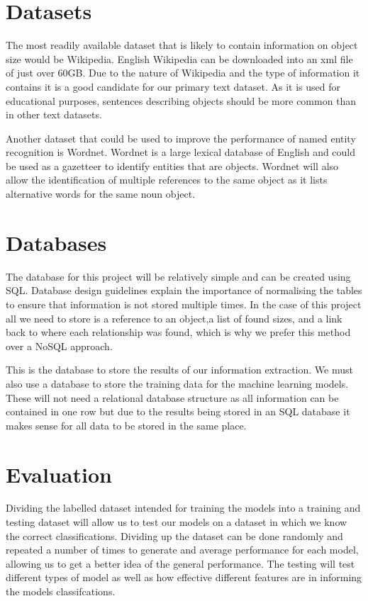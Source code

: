 \documentclass[11pt,oneside]{book}
\begin{document}
\section{Datasets}
The most readily available dataset that is likely to contain information on object size would be Wikipedia. English Wikipedia can be downloaded into an xml file of just over 60GB. Due to the nature of Wikipedia and the type of information it contains it is a good candidate for our primary text dataset. As it is used for educational purposes, sentences describing objects should be more common than in other text datasets.

Another dataset that could be used to improve the performance of named entity recognition is Wordnet. Wordnet is a large lexical database of English and could be used as a gazetteer to identify entities that are objects. Wordnet will also allow the identification of multiple references to the same object as it lists alternative words for the same noun object.

\section{Databases}
The database for this project will be relatively simple and can be created using SQL. Database design guidelines explain the importance of normalising the tables to ensure that information is not stored multiple times. In the case of this project all we need to store is a reference to an object,a list of found sizes, and a link back to where each relationship was found, which is why we prefer this method over a NoSQL approach.

This is the database to store the results of our information extraction. We must also use a database to store the training data for the machine learning models. These will not need a relational database structure as all information can be contained in one row but due to the results being stored in an SQL database it makes sense for all data to be stored in the same place.

\section{Evaluation}
Dividing the labelled dataset intended for training the models into a training and testing dataset will allow us to test our models on a dataset in which we know the correct classifications. Dividing up the dataset can be done randomly and repeated a number of times to generate and average performance for each model, allowing us to get a better idea of the general performance. The testing will test different types of model as well as how effective different features are in informing the models classifcations.
\end{document}
